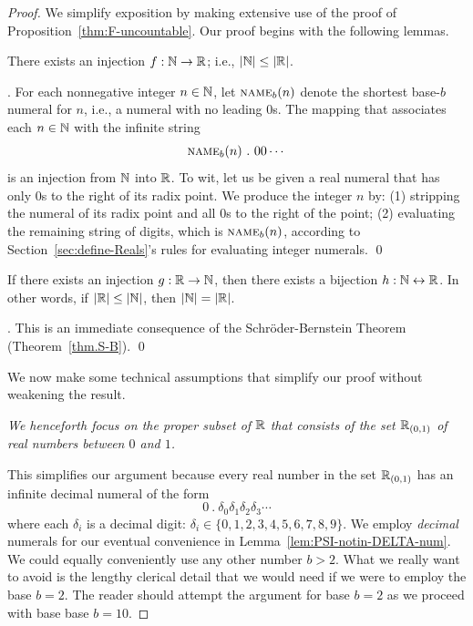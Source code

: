\begin{proof}
We simplify exposition by making extensive use of the proof of Proposition~\ref{thm:F-uncountable}.  Our proof begins with the following lemmas.

\smallskip

\begin{lemma}
\label{lem:N-leq-R}
There exists an injection $f: \mathbb{N} \rightarrow \mathbb{R}$; i.e., $|\mathbb{N}| \leq |\mathbb{R}|$.
\end{lemma}

.
For each nonnegative integer $n \in \mathbb{N}$, let $\mbox{\sc name}_b(n)$ denote the shortest base-$b$ numeral for $n$, i.e., a numeral with no leading $0$s.  The mapping that associates each $n \in \mathbb{N}$ with the infinite string
\[ \mbox{\sc name}_b(n) \ . \ 00 \cdots \]
is an injection from $\mathbb{N}$ into $\mathbb{R}$.  To wit, let us be given a real numeral that has only $0$s to the right of its radix point.  We produce the integer $n$ by: (1) stripping the numeral of its radix point and all $0$s to the right of the point; (2) evaluating the remaining string of digits, which is $\mbox{\sc name}_b(n)$, according to Section~\ref{sec:define-Reals}'s rules for evaluating integer numerals.  \qed

\smallskip

\begin{lemma}
\label{lem:N-=-R}
If there exists an injection $g: \mathbb{R} \rightarrow \mathbb{N}$, then there exists a bijection  $h: \mathbb{N} \leftrightarrow \mathbb{R}$.  In other words, if $|\mathbb{R}| \leq |\mathbb{N}|$, then $|\mathbb{N}| = |\mathbb{R}|$.
\end{lemma}

.
This is an immediate consequence of the Schr\"{o}der-Bernstein Theorem (Theorem~\ref{thm.S-B}).  \qed

\medskip

We now make some technical assumptions that simplify our proof without weakening the result.

\smallskip

\noindent
{\em We henceforth focus on the proper subset of $\mathbb{R}$ that consists of the set $\mathbb{R}_{(0,1)}$ of real numbers between $0$ and $1$.}

\smallskip

This simplifies our argument because every real number in the set $\mathbb{R}_{(0,1)}$ has an infinite decimal numeral of the form
\[ 0 \ . \ \delta_0 \delta_1 \delta_2 \delta_3 \cdots \]
where each $\delta_i$ is a decimal digit: $\delta_i \in \{0, 1, 2, 3, 4, 5, 6, 7, 8, 9\}$.  We employ {\em decimal} numerals for our eventual convenience in Lemma~\ref{lem:PSI-notin-DELTA-num}.  We could equally conveniently use any other number $b >2$.  What we really want to avoid is the lengthy clerical detail that we would need if we were to employ the base $b=2$.  The reader should attempt the argument for base $b=2$ as we proceed with base base $b=10$.


\end{proof}
